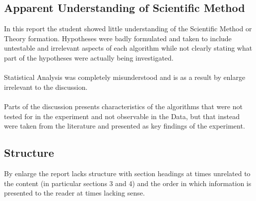 \documentclass{article}
\begin{document}
    \subsection{Apparent Understanding of Scientific Method}
      In this report the student showed little understanding of the Scientific Method or Theory formation. Hypotheses were badly formulated and taken to include untestable and irrelevant aspects of each algorithm while not clearly stating what part of the hypotheses were actually being investigated.
      \\\\
      Statistical Analysis was completely misunderstood and is as a result by enlarge irrelevant to the discussion.
      \\\\
      Parts of the discussion presents characteristics of the algorithms that were not tested for in the experiment and not observable in the Data, but that instead were taken from the literature and presented as key findings of the experiment.
    \subsection{Structure}
      By enlarge the report lacks structure with section headings at times unrelated to the content (in particular sections 3 and 4) and the order in which information is presented to the reader at times lacking sense.
	
\end{document}
